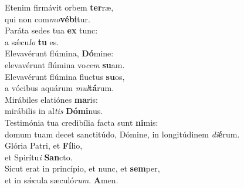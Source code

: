 \evenverse Etenim firmávit orbem \textbf{ter}ræ,~\*\\
\evenverse qui non com\textit{mo}\textbf{vé}\textbf{bi}tur.\\
\oddverse Paráta sedes tua \textbf{ex} tunc:~\*\\
\oddverse a sǽcu\textit{lo} \textbf{tu} es.\\
\evenverse Elevavérunt flúmina, \textbf{Dó}mine:~\*\\
\evenverse elevavérunt flúmina vo\textit{cem} \textbf{su}am.\\
\oddverse Elevavérunt flúmina fluctus \textbf{su}os,~\*\\
\oddverse a vócibus aquárum \textit{mul}\textbf{tá}rum.\\
\evenverse Mirábiles elatiónes \textbf{ma}ris:~\*\\
\evenverse mirábilis in al\textit{tis} \textbf{Dó}\textbf{mi}nus.\\
\oddverse Testimónia tua credibília facta sunt \textbf{ni}mis:~\*\\
\oddverse domum tuam decet sanctitúdo, Dómine, in longitúdinem \textit{di}\textbf{é}rum.\\
\evenverse Glória Patri, et \textbf{Fí}lio,~\*\\
\evenverse et Spirítu\textit{i} \textbf{San}cto.\\
\oddverse Sicut erat in princípio, et nunc, et \textbf{sem}per,~\*\\
\oddverse et in sǽcula sæculó\textit{rum}. \textbf{A}men.\\
